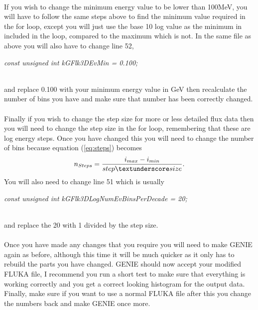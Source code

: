 \documentclass[12pt]{article}
\numberwithin{equation}{section}
\numberwithin{figure}{section}
\begin{document}
\\
If you wish to change the minimum energy value to be lower than 100MeV, you will have to follow the same steps above to find the minimum value required in the for loop, except you will just use the base 10 log value as the minimum in included in the loop, compared to the maximum which is not. In the same file as above you will also have to change line 52,\\
\centerline {\emph{const unsigned int kGFlk3DEvMin       = 0.100;}}\\
and replace 0.100 with your minimum energy value in GeV then recalculate the number of bins you have and make sure that number has been correctly changed.\\
\\
Finally if you wish to change the step size for more or less detailed flux data then you will need to change the step size in the for loop, remembering that these are log energy steps. Once you have changed this you will need to change the number of bins because equation (\ref{eq:steps}) becomes
\begin{equation}
    n_{Steps} = \frac{i_{max} - i_{min}}{step\textunderscore size}.
\end{equation}
You will also need to change line 51 which is usually\\
\centerline{\emph{const unsigned int kGFlk3DLogNumEvBinsPerDecade       = 20;}}\\
and replace the 20 with 1 divided by the step size.\\
\\
Once you have made any changes that you require you will need to make GENIE again as before, although this time it will be much quicker as it only has to rebuild the parts you have changed. GENIE should now accept your modified FLUKA file, I recommend you run a short test to make sure that everything is working correctly and you get a correct looking histogram for the output data. Finally, make sure if you want to use a normal FLUKA file after this you change the numbers back and make GENIE once more.
%
%
%
%
%
% 
\end{document}
